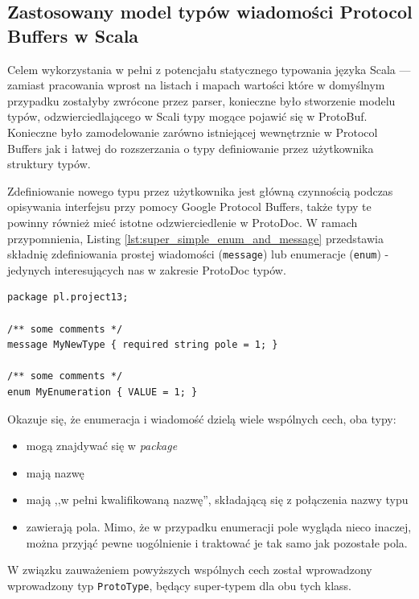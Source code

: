 \documentclass[pdflatex,11pt]{aghdpl}
\begin{document}
\newpage
\subsection{Zastosowany model typów wiadomości Protocol Buffers w Scala}
\label{the_types}
Celem wykorzystania w pełni z potencjału statycznego typowania języka Scala --- zamiast pracowania wprost na listach i mapach wartości które 
w domyślnym przypadku zostałyby zwrócone przez parser, konieczne było stworzenie modelu typów, odzwierciedlającego w Scali typy mogące pojawić się w ProtoBuf.
Konieczne było zamodelowanie zarówno istniejącej wewnętrznie w Protocol Buffers jak i łatwej do rozszerzania o typy definiowanie przez użytkownika struktury typów.

Zdefiniowanie nowego typu przez użytkownika jest główną czynnością podczas opisywania interfejsu przy pomocy Google Protocol Buffers, także typy te powinny
również mieć istotne odzwierciedlenie w ProtoDoc. W ramach przypomnienia, Listing \ref{lst:super_simple_enum_and_message} przedstawia składnię zdefiniowania prostej 
wiadomości (\verb|message|) lub enumeracje (\verb|enum|) - jedynych interesujących nas w zakresie ProtoDoc typów. 

\begin{lstlisting}[caption={Przykład zdefiniowania nowych typów w Protocol Buffers IDL}, label={lst:super_simple_enum_and_message}]
package pl.project13;

/** some comments */
message MyNewType { required string pole = 1; }

/** some comments */
enum MyEnumeration { VALUE = 1; }
\end{lstlisting}

Okazuje się, że enumeracja i wiadomość dzielą wiele wspólnych cech, oba typy:
\begin{itemize}
 \item mogą znajdywać się w \textit{package}
 \item mają nazwę
 \item mają ,,w pełni kwalifikowaną nazwę'', składającą się z połączenia nazwy typu
 \item zawierają pola. Mimo, że w przypadku enumeracji pole wygląda nieco inaczej, można przyjąć pewne uogólnienie i traktować je tak samo jak pozostałe pola.
\end{itemize}

W związku zauważeniem powyższych wspólnych cech został wprowadzony wprowadzony typ \verb|ProtoType|, będący super-typem dla obu tych klass.
\end{document}
